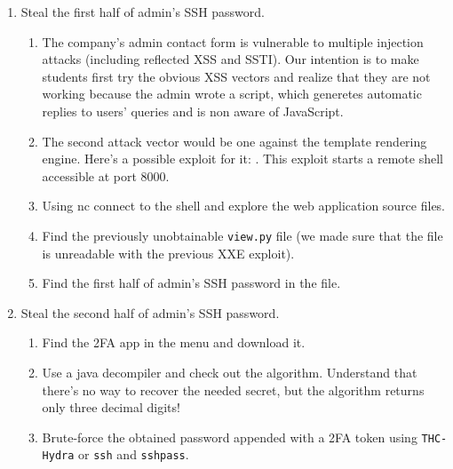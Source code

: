 \documentclass[a4paper]{article}
\begin{document}
\begin{enumerate}
      \item Steal the first half of admin's SSH password.
        \begin{enumerate}
          \item The company's admin contact form is vulnerable to multiple
            injection attacks (including reflected XSS and SSTI). Our intention
            is to make students first try the obvious XSS vectors and realize
            that they are not working because the admin wrote a script, which
            generetes automatic replies to users' queries and is non aware of
            JavaScript.
          \item The second attack vector would be one against the template
            rendering engine. Here's a possible exploit for it:
            .
            This exploit starts a remote shell accessible at port 8000.
          \item Using nc connect to the shell and explore the web application
            source files.
          \item Find the previously unobtainable \texttt{view.py} file (we made
            sure that the file is unreadable with the previous XXE exploit).
          \item Find the first half of admin's SSH password in the file.
        \end{enumerate}

      \item Steal the second half of admin's SSH password.
        \begin{enumerate}
          \item Find the 2FA app in the menu and download it.
          \item Use a java decompiler and check out the algorithm.
            Understand that there's no way to recover the needed secret, but
            the algorithm returns only three decimal digits!
          \item Brute-force the obtained password appended with a 2FA token
            using \texttt{THC-Hydra} or \texttt{ssh} and \texttt{sshpass}.
        \end{enumerate}


\end{enumerate}
\end{document}
